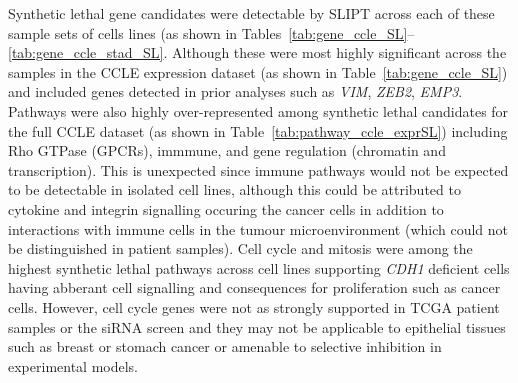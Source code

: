 Synthetic lethal gene candidates were detectable by SLIPT across each of these sample sets of cells lines (as shown in Tables~\ref{tab:gene_ccle_SL}\nobreakdash--\ref{tab:gene_ccle_stad_SL}. Although these were most highly significant across the samples in the CCLE expression dataset (as shown in Table~\ref{tab:gene_ccle_SL}) and included genes detected in prior analyses such as \textit{VIM}, \textit{ZEB2}, \textit{EMP3}. Pathways were also highly over-represented among synthetic lethal candidates for the full CCLE dataset (as shown in Table~\ref{tab:pathway_ccle_exprSL}) including Rho GTPase (GPCRs), immmune, and gene regulation (chromatin and transcription). This is unexpected since immune pathways would not be expected to be detectable in isolated cell lines, although this could be attributed to cytokine and integrin signalling occuring the cancer cells in addition to interactions with immune cells in the tumour microenvironment (which could not be distinguished in patient samples). Cell cycle and mitosis were among the highest synthetic lethal pathways across cell lines supporting \textit{CDH1} deficient cells having abberant cell signalling and consequences for proliferation such as cancer cells. However, cell cycle genes were not as strongly supported in TCGA patient samples or the siRNA screen \citep{Telford2015} and they may not be applicable to epithelial tissues such as breast or stomach cancer or amenable to selective inhibition in experimental models.   

